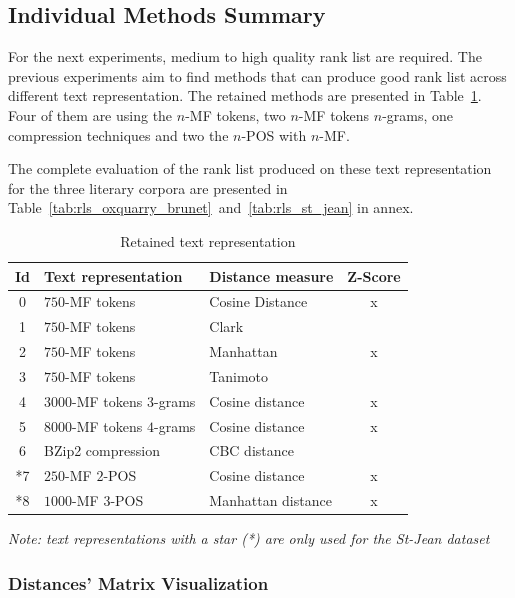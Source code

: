 \subsection{Individual Methods Summary \label{sec:individual_methods_summary}}

For the next experiments, medium to high quality rank list are required.
The previous experiments aim to find methods that can produce good rank list across different text representation.
The retained methods are presented in Table~\ref{tab:9rl}.
Four of them are using the $n$-MF tokens, two $n$-MF tokens $n$-grams, one compression techniques and two the $n$-POS with $n$-MF.

The complete evaluation of the rank list produced on these text representation for the three literary corpora are presented in Table~\ref{tab:rls_oxquarry_brunet}~and~\ref{tab:rls_st_jean} in annex.

\begin{table}
  \centering
  \caption{Retained text representation}
  \label{tab:9rl}
  \begin{tabular}{c l l c}
    \toprule
    Id &
    Text representation &
    Distance measure &
    Z-Score \\
    \midrule
    0 & $750$-MF tokens & Cosine Distance & x\\
    1 & $750$-MF tokens & Clark & \\
    2 & $750$-MF tokens & Manhattan & x\\
    3 & $750$-MF tokens & Tanimoto & \\
    4 & $3000$-MF tokens $3$-grams & Cosine distance & x\\
    5 & $8000$-MF tokens $4$-grams & Cosine distance & x\\
    6 & BZip2 compression & CBC distance & \\
    *7 & $250$-MF $2$-POS & Cosine distance & x\\
    *8 & $1000$-MF $3$-POS & Manhattan distance & x\\
    \bottomrule
  \end{tabular}

  \vspace{0.2cm}
  \textit{Note: text representations with a star (*) are only used for the St-Jean dataset}
\end{table}

\subsubsection{Distances' Matrix Visualization}

